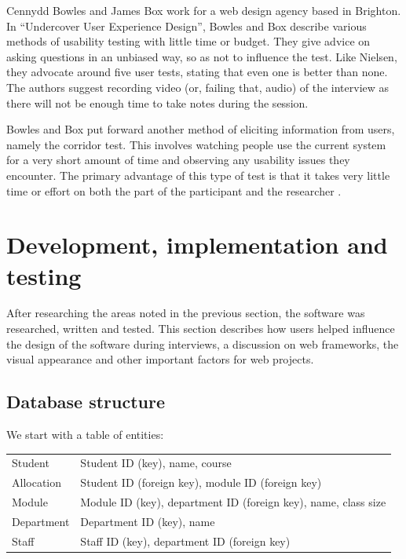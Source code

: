 \documentclass[]{scrartcl}
\begin{document}
Cennydd Bowles and James Box work for a web design agency based in Brighton.
In ``Undercover User Experience Design'', Bowles and Box describe various
methods of usability testing with little time or budget. They give advice on
asking questions in an unbiased way, so as not to influence the test. Like
Nielsen, they advocate around five user tests, stating that even one is better
than none. The authors suggest recording video (or, failing that, audio) of
the interview as there will not be enough time to take notes during the
session.

Bowles and Box put forward another method of eliciting information from users,
namely the corridor test. This involves watching people use the current system
for a very short amount of time and observing any usability issues they
encounter. The primary advantage of this type of test is that it takes very
little time or effort on both the part of the participant and the researcher
\cite{bowles2011undercover}.

\section{Development, implementation and testing}


After researching the areas noted in the previous section, the software was
researched, written and tested. This section describes how users helped
influence the design of the software during interviews, a discussion on web
frameworks, the visual appearance and other important factors for web
projects.

\subsection{Database structure}

We start with a table of entities:

\begin{tabular}{ l l }
  Student    & Student ID (key), name, course \\
  Allocation & Student ID (foreign key), module ID (foreign key) \\
  Module     & Module ID (key), department ID (foreign key), name, class size \\
  Department & Department ID (key), name \\
  Staff      & Staff ID (key), department ID (foreign key) \\
\end{tabular}
\end{document}
